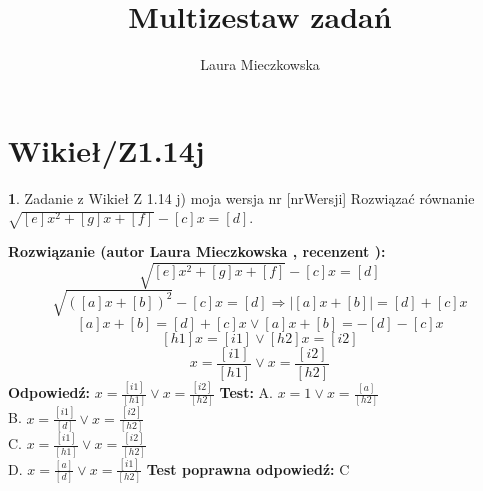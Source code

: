 \documentclass[12pt, a4paper]{article}
\title{Multizestaw zadań}
\author{Laura Mieczkowska}
\date{}
\theoremstyle{definition} %
\newtheorem{zad}{}
\newcommand{\kategoria}[1]{\section{#1}} %
\newcommand{\zadStart}[1]{\begin{zad}#1\newline} %
\newcommand{\zadStop}{\end{zad}}   %
\newcommand{\rozwStart}[2]{\noindent \textbf{Rozwiązanie (autor #1 , recenzent #2): }\newline} %
\newcommand{\odpStart}{\noindent \textbf{Odpowiedź:}\newline}    %
\newcommand{\odpStop}{\newline}                                             %
\newcommand{\testStart}{\noindent \textbf{Test:}\newline} %
\newcommand{\testStop}{\newline} %
\newcommand{\kluczStart}{\noindent \textbf{Test poprawna odpowiedź:}\newline} %
\newcommand{\kluczStop}{\newline} %
\begin{document}
\maketitle


\kategoria{Wikieł/Z1.14j}
\zadStart{Zadanie z Wikieł Z 1.14 j) moja wersja nr [nrWersji]}
Rozwiązać równanie $\sqrt{[e]x^2+[g]x+[f]}-[c]x=[d]$.
\zadStop
\rozwStart{Laura Mieczkowska}{}
$$\sqrt{[e]x^2+[g]x+[f]}-[c]x=[d]$$ 
$$\sqrt{([a]x+[b])^2}-[c]x=[d]\Rightarrow |[a]x+[b]|=[d]+[c]x$$
$$[a]x+[b]=[d]+[c]x \vee [a]x+[b]=-[d]-[c]x$$
$$[h1]x=[i1] \vee [h2]x=[i2]$$
$$x=\frac{[i1]}{[h1]} \vee x=\frac{[i2]}{[h2]}$$
\odpStart
$x=\frac{[i1]}{[h1]} \vee x=\frac{[i2]}{[h2]}$
\odpStop
\testStart
A. $x=1 \vee x=\frac{[a]}{[h2]}$ \\
B. $x=\frac{[i1]}{[d]} \vee x=\frac{[i2]}{[h2]}$ \\
C. $x=\frac{[i1]}{[h1]} \vee x=\frac{[i2]}{[h2]}$ \\
D. $x=\frac{[a]}{[d]} \vee x=\frac{[i1]}{[h2]}$ 
\testStop
\kluczStart
C
\kluczStop
\end{document}
